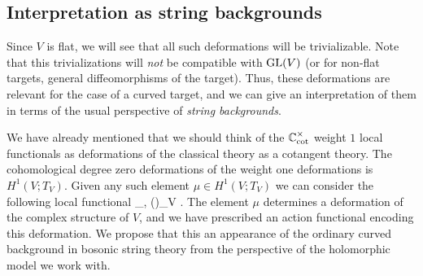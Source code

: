 %
%
%
%

\subsection{Interpretation as string backgrounds}

Since $V$ is flat,
we will see that all such  deformations will be trivializable. 
Note that this trivializations will {\em not} be compatible with ${\rm GL}(V)$ (or for non-flat targets, general diffeomorphisms of the target). 
Thus, these deformations are relevant for the case of a curved target, and we can give an interpretation of them in terms of the usual perspective of {\em string backgrounds}. 

We have already mentioned that we should think of the $\mathbb C^\times_{\rm cot}$ weight $1$ local functionals as deformations of the classical theory as a cotangent theory.
The cohomological degree zero deformations of the weight one deformations is $H^1(V ; T_V)$. 
Given any such element $\mu \in H^1(V ; T_V)$ we can consider the following local functional
\ben
\int_\Sigma \<\beta, \mu(\gamma)\>_V .
\een 
The element $\mu$ determines a deformation of the complex structure of $V$, and we have prescribed an action functional encoding this deformation. 
We propose that this an appearance of the ordinary curved background in bosonic string theory from the perspective of the holomorphic model we work with.

